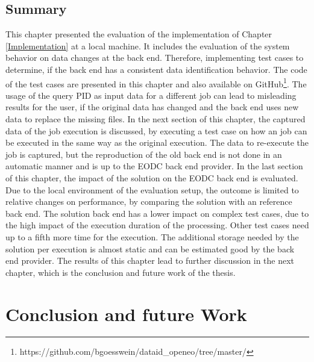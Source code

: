 \documentclass[draft,final]{vutinfth} %
\begin{document}
\section{Summary}
This chapter presented the evaluation of the implementation of Chapter \ref{Implementation} at a local machine. It includes the evaluation of the system behavior on data changes at the back end. Therefore, implementing test cases to determine, if the back end has a consistent data identification behavior. The code of the test cases are presented in this chapter and also available on GitHub\footnote{https://github.com/bgoesswein/dataid\_openeo/tree/master/}. The usage of the query PID as input data for a different job can lead to misleading results for the user, if the original data has changed and the back end uses new data to replace the missing files. 
In the next section of this chapter, the captured data of the job execution is discussed, by executing a test case on how an job can be executed in the same way as the original execution. The data to re-execute the job is captured, but the reproduction of the old back end is not done in an automatic manner and is up to the EODC back end provider. In the last section of this chapter, the impact of the solution on the EODC back end is evaluated. Due to the local environment of the evaluation setup, the outcome is limited to relative changes on performance, by comparing the solution with an reference back end. The solution back end has a lower impact on complex test cases, due to the high impact of the execution duration of the processing. Other test cases need up to a fifth more time for the execution. The additional storage needed by the solution per execution is almost static and can be estimated good by the back end provider. The results of this chapter lead to further discussion in the next chapter, which is the conclusion and future work of the thesis.
   
\chapter{Conclusion and future Work}\label{Conclusion}
\end{document}
